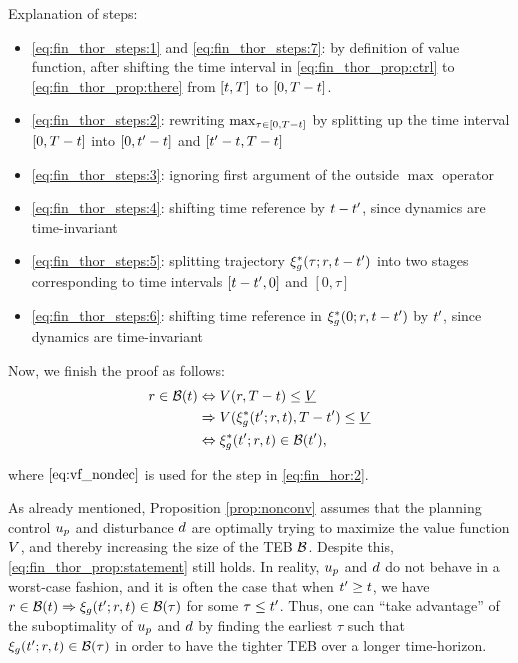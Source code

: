 \begin{IEEEproof}
Explanation of steps:
\begin{itemize}
  \item \eqref{eq:fin_thor_steps:1} and \eqref{eq:fin_thor_steps:7}: by definition of value function, after shifting the time interval in \eqref{eq:fin_thor_prop:ctrl} to \eqref{eq:fin_thor_prop:there} from $[t, T]$ to $[0, T-t]$.
  \item \eqref{eq:fin_thor_steps:2}: rewriting $\max_{\tau \in [0, T-t]}$ by splitting up the time interval $[0, T-t]$ into $[0, t'-t]$ and $[t'-t, T-t]$
  \item \eqref{eq:fin_thor_steps:3}: ignoring first argument of the outside $\max$ operator
  \item \eqref{eq:fin_thor_steps:4}: shifting time reference by $t-t'$, since dynamics are time-invariant
  \item \eqref{eq:fin_thor_steps:5}: splitting trajectory $\xi_g^*(\tau; r, t-t')$ into two stages corresponding to time intervals $[t-t', 0]$ and $[0, \tau]$
  \item \eqref{eq:fin_thor_steps:6}: shifting time reference in $\xi_g^*(0; r, t-t')$ by $t'$, since dynamics are time-invariant
\end{itemize}

Now, we finish the proof as follows:
\begin{subequations} \label{eq:fin_hor}
  \begin{align}
  \rstate \in \TEB(\tvar) &\Leftrightarrow \valfunc(\rstate, \thor - \tvar) \le \underline\valfunc \\
  & \Rightarrow  \valfunc(\rtraj^*(\tvar'; \rstate, \tvar), \thor - \tvar') \le \underline\valfunc \label{eq:fin_hor:2}\\
  & \Leftrightarrow \rtraj^*(\tvar'; \rstate, \tvar) \in \TEB(\tvar'),
  \end{align}
\end{subequations}

\noindent where $\eqref{eq:vf_nondec}$ is used for the step in \eqref{eq:fin_hor:2}.

\end{IEEEproof} 

\begin{rem}
  As already mentioned, Proposition \ref{prop:nonconv} assumes that the planning control $u_p$ and disturbance $d$ are optimally trying to maximize the value function $V$, and thereby increasing the size of the TEB $\mathcal B$.
  Despite this, \eqref{eq:fin_thor_prop:statement} still holds.
  In reality, $u_p$ and $d$ do not behave in a worst-case fashion, and it is often the case that when $t' \ge t$, we have $r \in \mathcal B(t) \Rightarrow \xi_g(t'; r, t) \in \mathcal B(\tau)$ for some $\tau \le t'$.
  Thus, one can ``take advantage'' of the suboptimality of $u_p$ and $d$ by finding the earliest $\tau$ such that $\xi_g(t'; r, t) \in \mathcal B(\tau)$ in order to have the tighter TEB over a longer time-horizon.
\end{rem}

